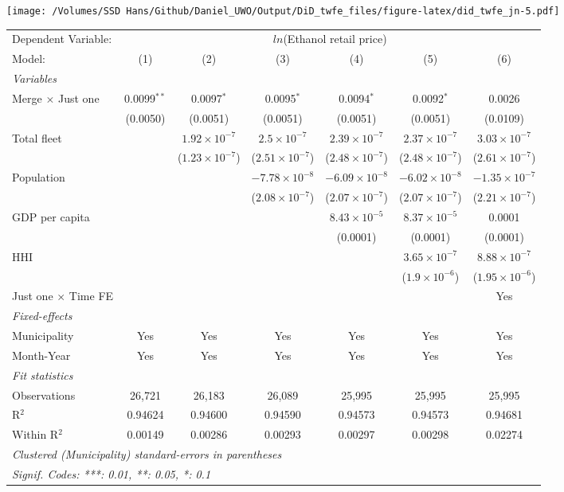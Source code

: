 \documentclass[
]{article}
\begin{document}
\texttt{[image: /Volumes/SSD Hans/Github/Daniel\_UWO/Output/DiD\_twfe\_files/figure-latex/did\_twfe\_jn-5.pdf]}

\begin{tabular}{lcccccc}
\tabularnewline\midrule\midrule
Dependent Variable:&\multicolumn{6}{c}{$ln$(Ethanol retail price)}\\
Model:&(1) & (2) & (3) & (4) & (5) & (6)\\
\midrule \emph{Variables}&   &   &   &   &   &  \\
Merge $\times $ Just one & 0.0099$^{**}$ & 0.0097$^{*}$ & 0.0095$^{*}$ & 0.0094$^{*}$ & 0.0092$^{*}$ & 0.0026\\
  &(0.0050) & (0.0051) & (0.0051) & (0.0051) & (0.0051) & (0.0109)\\
Total fleet &    & $1.92\times 10^{-7}$ & $2.5\times 10^{-7}$ & $2.39\times 10^{-7}$ & $2.37\times 10^{-7}$ & $3.03\times 10^{-7}$\\
  &   & ($1.23\times 10^{-7}$) & ($2.51\times 10^{-7}$) & ($2.48\times 10^{-7}$) & ($2.48\times 10^{-7}$) & ($2.61\times 10^{-7}$)\\
Population &    &    & $-7.78\times 10^{-8}$ & $-6.09\times 10^{-8}$ & $-6.02\times 10^{-8}$ & $-1.35\times 10^{-7}$\\
  &   &    & ($2.08\times 10^{-7}$) & ($2.07\times 10^{-7}$) & ($2.07\times 10^{-7}$) & ($2.21\times 10^{-7}$)\\
GDP per capita &    &    &    & $8.43\times 10^{-5}$ & $8.37\times 10^{-5}$ & 0.0001\\
  &   &    &    & (0.0001) & (0.0001) & (0.0001)\\
HHI &    &    &    &    & $3.65\times 10^{-7}$ & $8.88\times 10^{-7}$\\
  &   &    &    &    & ($1.9\times 10^{-6}$) & ($1.95\times 10^{-6}$)\\
Just one $\times$ Time FE &  &  &  &  &  & Yes\\
\midrule \emph{Fixed-effects}&   &   &   &   &   &  \\
Municipality & Yes & Yes & Yes & Yes & Yes & Yes\\
Month-Year & Yes & Yes & Yes & Yes & Yes & Yes\\
\midrule \emph{Fit statistics}&  & & & & & \\
Observations & 26,721&26,183&26,089&25,995&25,995&25,995\\
R$^2$ & 0.94624&0.94600&0.94590&0.94573&0.94573&0.94681\\
Within R$^2$ & 0.00149&0.00286&0.00293&0.00297&0.00298&0.02274\\
\midrule\midrule\multicolumn{7}{l}{\emph{Clustered (Municipality) standard-errors in parentheses}}\\
\multicolumn{7}{l}{\emph{Signif. Codes: ***: 0.01, **: 0.05, *: 0.1}}\\
\end{tabular}
\end{document}
